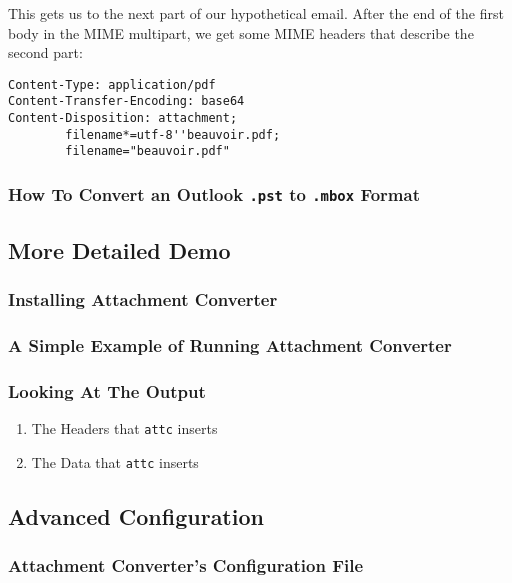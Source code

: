 \documentclass[11pt]{article}
\begin{document}
This gets us to the next part of our hypothetical email.  After the
end of the first body in the MIME multipart, we get some MIME headers
that describe the second part:

\begin{verbatim}
Content-Type: application/pdf
Content-Transfer-Encoding: base64
Content-Disposition: attachment; 
        filename*=utf-8''beauvoir.pdf;
        filename="beauvoir.pdf"
\end{verbatim}

\subsubsection{How To Convert an Outlook \texttt{.pst} to \texttt{.mbox} Format}
\label{sec:orgf4e4ab4}

\subsection{More Detailed Demo}
\label{sec:orgc8f006f}

\subsubsection{Installing Attachment Converter}
\label{sec:org5f50291}

\subsubsection{A Simple Example of Running Attachment Converter}
\label{sec:org84120d7}

\subsubsection{Looking At The Output}
\label{sec:org9ffba8e}

\begin{enumerate}
\item The Headers that \texttt{attc} inserts
\label{sec:org1c73bbe}

\item The Data that \texttt{attc} inserts
\label{sec:orgd75445a}
\end{enumerate}

\subsection{Advanced Configuration}
\label{sec:org24eaae3}

\subsubsection{Attachment Converter's Configuration File}
\label{sec:org377f8c9}
\end{document}
